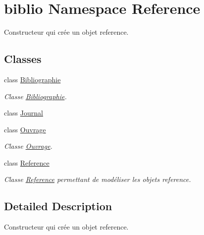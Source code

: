 \hypertarget{namespacebiblio}{}\section{biblio Namespace Reference}
\label{namespacebiblio}


Constructeur qui crée un objet reference.  


\subsection*{Classes}
\begin{DoxyCompactItemize}
\item 
class \hyperlink{classbiblio_1_1Bibliographie}{Bibliographie}
\begin{DoxyCompactList}\small\item\em Classe \hyperlink{classbiblio_1_1Bibliographie}{Bibliographie}. \end{DoxyCompactList}\item 
class \hyperlink{classbiblio_1_1Journal}{Journal}
\item 
class \hyperlink{classbiblio_1_1Ouvrage}{Ouvrage}
\begin{DoxyCompactList}\small\item\em Classe \hyperlink{classbiblio_1_1Ouvrage}{Ouvrage}. \end{DoxyCompactList}\item 
class \hyperlink{classbiblio_1_1Reference}{Reference}
\begin{DoxyCompactList}\small\item\em Classe \hyperlink{classbiblio_1_1Reference}{Reference} permettant de modéliser les objets reference. \end{DoxyCompactList}\end{DoxyCompactItemize}


\subsection{Detailed Description}
Constructeur qui crée un objet reference. 


